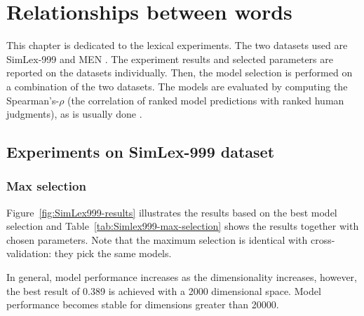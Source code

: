 \chapter{Relationships between words}
\label{sec:lexical}

This chapter is dedicated to the lexical experiments.\footnotemark{}
The two datasets used are  SimLex-999 \cite{hill2014simlex} and MEN \cite{Bruni:2014:MDS:2655713.2655714}.
The experiment results and selected parameters are reported on the datasets individually. Then, the model selection is performed on a combination of the two datasets. The models are evaluated by computing the Spearman's-$\rho$ (the correlation of ranked model predictions with ranked human judgments), as is usually done \cite{Bruni:2014:MDS:2655713.2655714,hill2014simlex}.\footnotemark{}


\section{Experiments on SimLex-999 dataset}
\label{sec:simlex-999}

\subsection{Max selection}
\label{sec:max-selection-simlex}


%
%
%

Figure~\ref{fig:SimLex999-results} illustrates the results based on the best model selection and Table~\ref{tab:Simlex999-max-selection} shows the results together with chosen parameters. Note that the maximum selection is identical with cross-validation: they pick the same models.

In general, model performance increases as the dimensionality increases, however, the best result of 0.389 is achieved with a 2000 dimensional space. Model performance becomes stable for dimensions greater than 20000.



